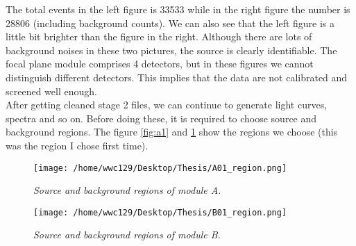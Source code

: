 \documentclass[12pt]{report}
\begin{document}
        The total events in the left figure is 33533 while in the right figure the number is 28806 
        (including background counts). We can also see that the left figure is a little bit brighter than the figure
        in the right. Although there are lots of background noises in these two pictures, 
        the source is clearly identifiable. 
        The focal plane module comprises 4 detectors, but in these figures we cannot distinguish different detectors.
        This implies that the data are not calibrated and screened well enough. \\
        \indent After getting cleaned stage 2 files, we can continue to generate light curves, spectra and so on. 
        Before doing these, it is required to choose source and background regions. The figure \ref{fig:a1} and 
        \ref{fig:b1} show the regions we choose (this was the region I chose first time). 
        \begin{figure}[h]
          \hspace{0.7cm}
          \begin{minipage}{0.45\textwidth} 
            \centering 
            \texttt{[image: /home/wwc129/Desktop/Thesis/A01\_region.png]}
            \caption{\textit{\footnotesize Source and background regions of module A. }}
            \label{fig:a1}
          \end{minipage}
          \hspace{0.1cm} 
          \begin{minipage}{0.45\textwidth}
            \centering 
            \texttt{[image: /home/wwc129/Desktop/Thesis/B01\_region.png]}
            \caption{\textit{\footnotesize Source and background regions of module B. }}
            \label{fig:b1}
          \end{minipage}
        \end{figure}
        
\end{document}
